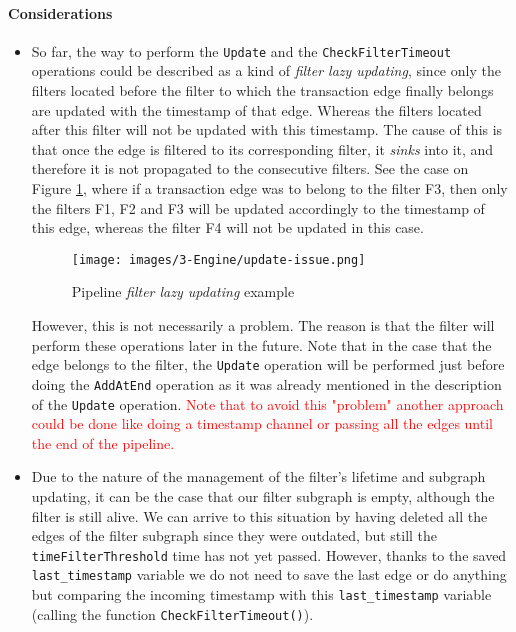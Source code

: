 \paragraph{Considerations}
\begin{itemize}
    \item So far, the way to perform the \texttt{Update} and the \texttt{CheckFilterTimeout} operations could be described as a kind of \textit{filter lazy updating}, since only the filters located before the filter to which the transaction edge finally belongs are updated with the timestamp of that edge. Whereas the filters located after this filter will not be updated with this timestamp. The cause of this is that once the edge is filtered to its corresponding filter, it \textit{sinks} into it, and therefore it is not propagated to the consecutive filters. See the case on Figure \ref{img:pipeline-update-issue}, where if a transaction edge was to belong to the filter F3, then only the filters F1, F2 and F3 will be updated accordingly to the timestamp of this edge, whereas the filter F4 will not be updated in this case.
    \begin{figure}[H]
        \centering
        \texttt{[image: images/3-Engine/update-issue.png]}
        \caption{Pipeline \textit{filter lazy updating} example}
        \label{img:pipeline-update-issue}
    \end{figure}
    However, this is not necessarily a problem. The reason is that the filter will perform these operations later in the future. Note that in the case that the edge belongs to the filter, the \texttt{Update} operation will be performed just before doing the \texttt{AddAtEnd} operation as it was already mentioned in the description of the \texttt{Update} operation. \textcolor{red}{Note that to avoid this "problem" another approach could be done like doing a timestamp channel or passing all the edges until the end of the pipeline.} 
    \item Due to the nature of the management of the filter's lifetime and subgraph updating, it can be the case that our filter subgraph is empty, although the filter is still alive. We can arrive to this situation by having deleted all the edges of the filter subgraph since they were outdated, but still the \texttt{timeFilterThreshold} time has not yet passed. However, thanks to the saved \texttt{last\_timestamp} variable we do not need to save the last edge or do anything but comparing the incoming timestamp with this 
    \texttt{last\_timestamp} variable (calling the function \texttt{CheckFilterTimeout()}).
\end{itemize}

